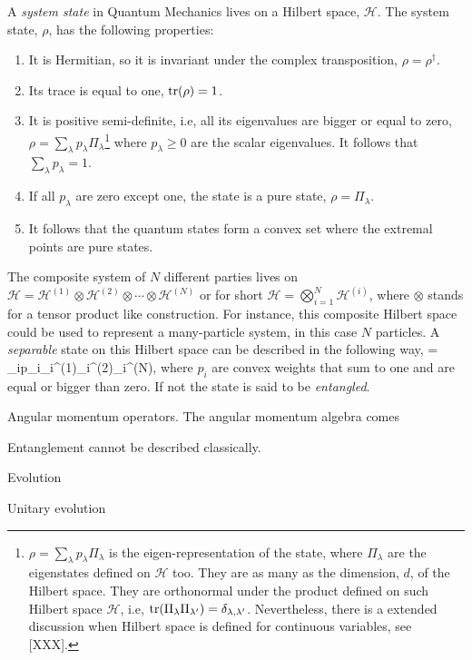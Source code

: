 A \emph{system state} in Quantum Mechanics lives on a Hilbert space, $\mathcal{H}$.
The system state, $\rho$, has the following properties:
\begin{enumerate}
  \item
  It is Hermitian, so it is invariant under the complex transposition, $\rho=\rho^\dagger$.
  \item Its trace is equal to one, $\operatorname{tr}(\rho)=1$.
  \item It is positive semi-definite, i.e, all its eigenvalues are bigger or equal to zero, $\rho=\sum_{\lambda}p_\lambda \Pi_\lambda$\footnote{
    $\rho=\sum_{\lambda}p_\lambda \Pi_{\lambda}$ is the eigen-representation of the state, where $\Pi_{\lambda}$ are the eigenstates defined on $\mathcal{H}$ too.
    They are as many as the dimension, $d$, of the Hilbert space.
    They are orthonormal under the product defined on such Hilbert space $\mathcal{H}$, i.e, $\operatorname{tr}(\Pi_{\lambda}\Pi_{\lambda'})=\delta_{\lambda,\lambda'}$.
    Nevertheless, there is a extended discussion when Hilbert space is defined for continuous variables, see [XXX].
  } where $p_\lambda\geq 0$ are the scalar eigenvalues.
  It follows that $\sum_\lambda p_\lambda = 1$.
  \item If all $p_\lambda$ are zero except one, the state is a pure state, $\rho=\Pi_\lambda$.
  \item It follows that the quantum states form a convex set where the extremal points are pure states.
\end{enumerate}


The composite system of $N$ different parties lives on $\mathcal{H} = \mathcal{H}^{(1)}\otimes\mathcal{H}^{(2)}\otimes\cdots\otimes\mathcal{H}^{(N)}$ or for short $\mathcal{H} = \bigotimes_{i=1}^N\mathcal{H}^{(i)}$, where $\otimes$ stands for a tensor product like construction.
For instance, this composite Hilbert space could be used to represent a many-particle system, in this case $N$ particles.
A \emph{separable} state on this Hilbert space can be described in the following way,
\be
  \rho = \sum_{i}p_i\rho_i^{(1)}\otimes\rho_i^{(2)}\otimes\cdots\otimes\rho_i^{(N)},
\ee
where $p_i$ are convex weights that sum to one and are equal or bigger than zero.
If not the state is said to be \emph{entangled}.


Angular momentum operators.
The angular momentum algebra comes

Entanglement cannot be described classically.

Evolution

Unitary evolution


